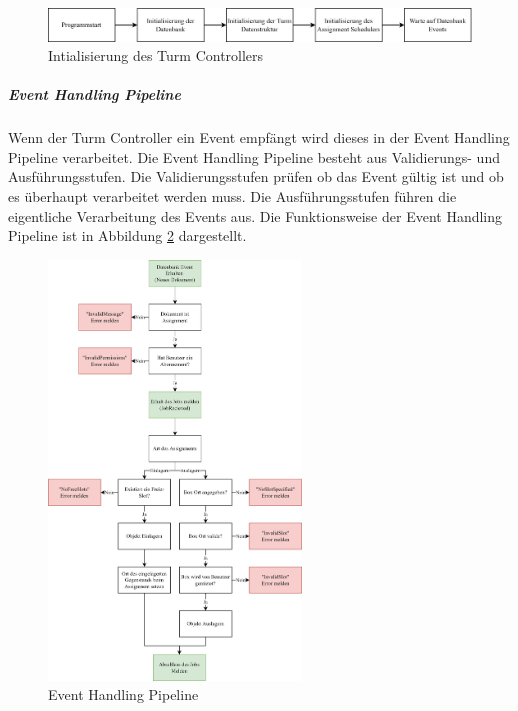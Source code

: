 \begin{figure}[H]
  \centering
  \includegraphics[width=1\textwidth]{images/tower_controller_v4_init.png}
  \caption{Intialisierung des Turm Controllers}
  \label{fig:tower_controller_v4_init}
\end{figure}

\clearpage

\subparagraph{Event Handling Pipeline}

Wenn der Turm Controller ein Event empfängt wird dieses in der Event Handling Pipeline verarbeitet. Die Event Handling Pipeline besteht aus Validierungs- und Ausführungsstufen. Die Validierungsstufen prüfen ob das Event gültig ist und ob es überhaupt verarbeitet werden muss. Die Ausführungsstufen führen die eigentliche Verarbeitung des Events aus. Die Funktionsweise der Event Handling Pipeline ist in Abbildung \ref{fig:tower_controller_v4_event_handling} dargestellt.

\begin{figure}[H]
  \centering
  \includegraphics[width=0.6\textwidth]{images/tower_controller_v4_event_handling.png}
  \caption{Event Handling Pipeline}
  \label{fig:tower_controller_v4_event_handling}
\end{figure}

